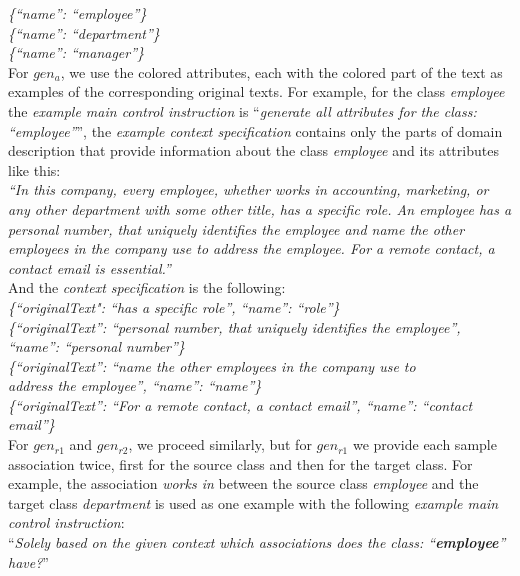 \noindent{}\textit{\frenchspacing\{``name'': ``employee''\} \\
\{``name'': ``department''\} \\
\{``name'': ``manager''\}} \\

For $gen_a$, we use the colored attributes, each with the colored part of the text as examples of the corresponding original texts. For example, for the class \textit{employee} the \emph{example main control instruction} is ``\textit{generate all attributes for the class: ``employee''}'', the \emph{example context specification} contains only the parts of domain description that provide information about the class \textit{employee} and its attributes like this: \\

\noindent{}\textit{``In this company, every employee, whether works in accounting, marketing, or any other department with some other title, has a specific role. An employee has a personal number, that uniquely identifies the employee and name the other employees in the company use to address the employee. For a remote contact, a contact email is essential.''} \\

\noindent{}And the \emph{context specification} is the following: \\

\noindent{}\textit{\frenchspacing\{``originalText": ``has a specific role'', ``name'': ``role''\} \\
\{``originalText'': ``personal number, that uniquely identifies the employee'', ``name'': ``personal number''\} \\
\{``originalText'': ``name the other employees in the company use to \\ address the employee'', ``name'': ``name''\} \\
\{``originalText'': ``For a remote contact, a contact email'', ``name'': ``contact email''\}} \\


For $gen_{r1}$ and ${gen_{r2}}$, we proceed similarly, but for ${gen_{r1}}$ we provide each sample association twice, first for the source class and then for the target class. For example, the association \textit{works in} between the source class \textit{employee} and the target class \textit{department} is used as one example with the following \emph{example main control instruction}: \\

\noindent{}``\textit{Solely based on the given context which associations does the class: ``\textbf{employee}'' have?}'' \\

